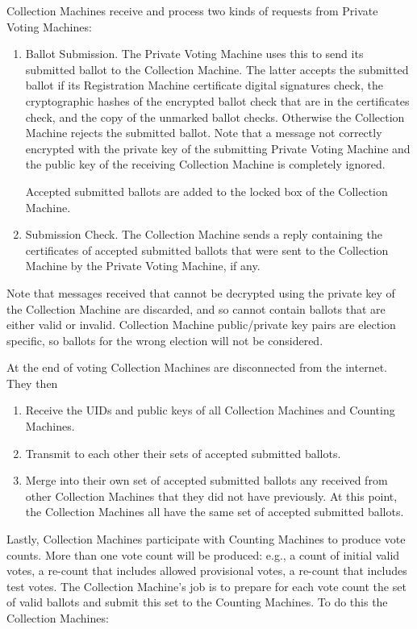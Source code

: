 \documentclass[12pt]{article}
\begin{document}
Collection Machines receive and process two kinds of requests from
Private Voting Machines:
\begin{enumerate}

\item
Ballot Submission.  The Private Voting Machine uses this to send
its submitted ballot to the Collection Machine.  The latter accepts
the submitted ballot if its Registration Machine certificate
digital signatures check, the cryptographic hashes of the
encrypted ballot check that are in the certificates check,
and the copy of the unmarked ballot checks.
Otherwise the Collection Machine rejects the submitted
ballot.  Note that a message not correctly encrypted with
the private key of the submitting Private Voting Machine and the
public key of the receiving Collection Machine is completely ignored.

Accepted submitted ballots are added to the locked box of the
Collection Machine.

\item
Submission Check.  The Collection Machine sends a reply containing
the certificates of accepted submitted ballots
that were sent to the Collection Machine
by the Private Voting Machine, if any.

\end{enumerate}

Note that messages received that cannot be decrypted using the
private key of the Collection Machine
are discarded, and so cannot contain
ballots that are either valid or invalid.  Collection Machine
public/private key pairs are election specific, so ballots for
the wrong election will not be considered.

At the end of voting Collection Machines are disconnected from
the internet.  They then
\begin{enumerate}
\item Receive the UIDs and public keys of all Collection Machines and
Counting Machines.
\item Transmit to each other their sets of accepted submitted ballots.
\item Merge into their own set of accepted submitted ballots any
received from other Collection Machines that they did not have previously.
At this point, the Collection Machines all have the same set of accepted
submitted ballots.
\setcounter{CMC-COUNTER}{\value{enumi}}
\end{enumerate}

Lastly, Collection Machines participate with Counting Machines to
produce vote counts.  More than one vote count will be produced:
e.g., a count of initial valid votes, a re-count that includes
allowed provisional votes, a re-count that includes test votes.
The Collection Machine's job is to prepare for each vote count
the set of valid ballots and submit this set to the Counting Machines.
To do this the Collection Machines:
\end{document}
